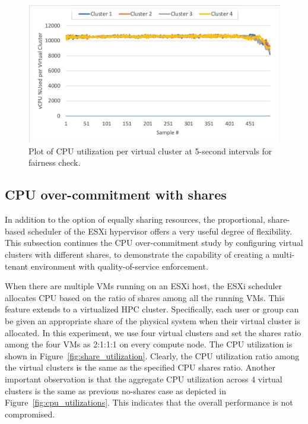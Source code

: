\begin{figure}[!t]
   \begin{center}
       \includegraphics[width=\columnwidth]{Figures/per_cluster_utilization}
   \end{center}
   \caption{Plot of CPU utilization per virtual cluster at 5-second intervals for fairness check.}
   \label{fig:per_cluster_utilization}
   \vspace{-0.2in}
 \end{figure}

\subsection{CPU over-commitment with shares}
In addition to the option of equally sharing resources, the proportional, share-based scheduler of the ESXi hypervisor offers a very useful degree of flexibility. This subsection continues the CPU over-commitment study by configuring virtual clusters with different shares, to demonstrate the capability of creating a multi-tenant environment with quality-of-service enforcement. 

When there are multiple VMs running on an ESXi host, the ESXi scheduler allocates CPU based on the ratio of shares among all the running VMs. This feature extends to a virtualized HPC cluster. Specifically, each user or group can be given an appropriate share of the physical system when their virtual cluster is allocated. In this experiment, we use four virtual clusters and set the shares ratio among the four VMs as 2:1:1:1 on every compute node. The CPU utilization is shown in Figure~\ref{fig:share_utilization}. Clearly, the CPU utilization ratio among the virtual clusters is the same as the specified CPU shares ratio. Another important observation is that the aggregate CPU utilization across 4 virtual clusters is the same as previous no-shares case as depicted in Figure~\ref{fig:cpu_utilizations}. This indicates that the overall performance is not compromised. 


